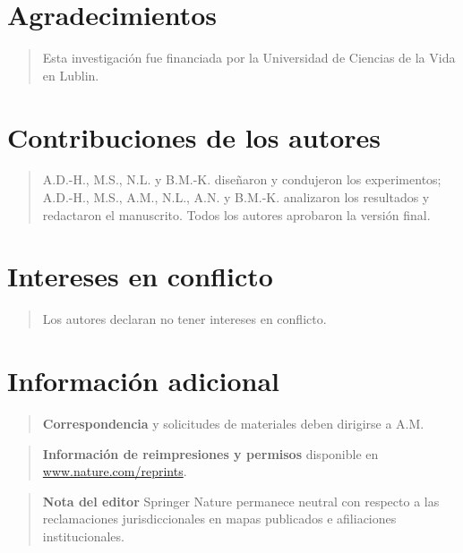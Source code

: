 \documentclass[
]{article}
\begin{document}
\section{Agradecimientos}\label{agradecimientos}

\begin{quote}
Esta investigación fue financiada por la Universidad de Ciencias de la
Vida en Lublin.
\end{quote}

\section{Contribuciones de los
autores}\label{contribuciones-de-los-autores}

\begin{quote}
A.D.-H., M.S., N.L. y B.M.-K. diseñaron y condujeron los experimentos;
A.D.-H., M.S., A.M., N.L., A.N. y B.M.-K. analizaron los resultados y
redactaron el manuscrito. Todos los autores aprobaron la versión final.
\end{quote}

\section{Intereses en conflicto}\label{intereses-en-conflicto}

\begin{quote}
Los autores declaran no tener intereses en conflicto.
\end{quote}

\section{Información adicional}\label{informaciuxf3n-adicional}

\begin{quote}
\textbf{Correspondencia} y solicitudes de materiales deben dirigirse a
A.M.
\end{quote}

\begin{quote}
\textbf{Información de reimpresiones y permisos} disponible en
\href{http://www.nature.com/reprints}{www.nature.com/reprints}.
\end{quote}

\begin{quote}
\textbf{Nota del editor} Springer Nature permanece neutral con respecto
a las reclamaciones jurisdiccionales en mapas publicados e afiliaciones
institucionales.
\end{quote}
\end{document}
